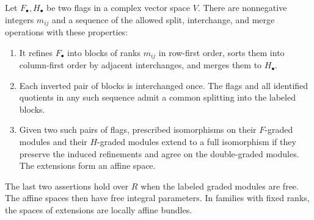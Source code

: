 \begin{lemma}\label{lem:two-flags}
Let $F_\bullet,H_\bullet$ be two flags in a complex vector space $V$.
There are nonnegative integers $m_{ij}$ and a sequence of the allowed
split, interchange, and merge operations with these properties:
\begin{enumerate}
\item It refines $F_\bullet$ into blocks of ranks $m_{ij}$ in row-first
order, sorts them into column-first order by adjacent interchanges,
and merges them to $H_\bullet$.
\item Each inverted pair of blocks is interchanged once.  The flags
and all identified quotients in any such sequence admit a common
splitting into the labeled blocks.
\item Given two such pairs of flags, prescribed isomorphisms on their
$F$-graded modules and their $H$-graded modules extend to a full
isomorphism if they preserve the induced refinements and agree on
the double-graded modules.  The extensions form an affine space.
\end{enumerate}
The last two assertions hold over $R$ when the labeled graded modules
are free.  The affine spaces then have free integral parameters.
In families with fixed ranks, the spaces of extensions are locally
affine bundles.
\end{lemma}

